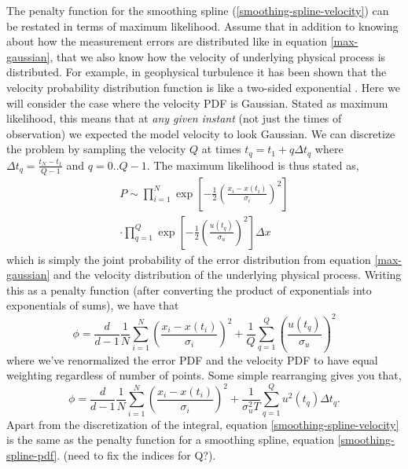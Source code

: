 \documentclass[10pt,journal]{IEEEtran}
\begin{document}
The penalty function for the smoothing spline (\ref{smoothing-spline-velocity}) can be restated in terms of maximum likelihood. Assume that in addition to knowing about how the measurement errors are distributed like in equation \ref{max-gaussian}, that we also know how the velocity of underlying physical process is distributed. For example, in geophysical turbulence it has been shown that the velocity probability distribution function is like a two-sided exponential \cite{bracco2000-pf}. Here we will consider the case where the velocity PDF is Gaussian. Stated as maximum likelihood, this means that at \emph{any given instant} (not just the times of observation) we expected the model velocity to look Gaussian. We can discretize the problem by sampling the velocity $Q$ at times $t_q = t_1 + q \Delta t_q$ where $\Delta t_q=\frac{t_N-t_1}{Q-1}$ and $q=0..Q-1$. The maximum likelihood is thus stated as,
\begin{equation}
\label{gaussian-max-likelihood}
\begin{split}
P \sim \prod^N _{i=1}\exp \left[ -\frac{1}{2} \left( \frac{x_i - x(t_i)}{\sigma_i} \right)^2 \right] \\\cdot \prod^{Q}_{q=1} \exp \left[  - \frac{1}{2} \left(  \frac{u(t_q)}{\sigma_u} \right)^2 \right] \Delta x
\end{split}
\end{equation}
which is simply the joint probability of the error distribution from equation \ref{max-gaussian} and the velocity distribution of the underlying physical process. Writing this as a penalty function (after converting the product of exponentials into exponentials of sums), we have that
\begin{equation}
\label{gaussian-max-likelihood-penalty}
\phi =  \frac{d}{d-1} \frac{1}{N} \sum^N _{i=1}\left( \frac{x_i - x(t_i)}{\sigma_i} \right)^2 + \frac{1}{Q} \sum^{Q}_{q=1}  \left(  \frac{u(t_q)}{\sigma_u} \right)^2
\end{equation}
where we've renormalized the error PDF and the velocity PDF to have equal weighting regardless of number of points. Some simple rearranging gives you that,
\begin{equation}
\label{smoothing-spline-pdf}
\phi =\frac{d}{d-1}  \frac{1}{N} \sum^N _{i=1}  \left( \frac{x_i - x(t_i)}{\sigma_i} \right)^2 + \frac{1}{\sigma_u^2 T} \sum^{Q}_{q=1}  u^2(t_q) \Delta t_q.
\end{equation}
Apart from the discretization of the integral, equation \ref{smoothing-spline-velocity} is the same as the penalty function for a smoothing spline, equation \ref{smoothing-spline-pdf}. (need to fix the indices for Q?).
\end{document}
